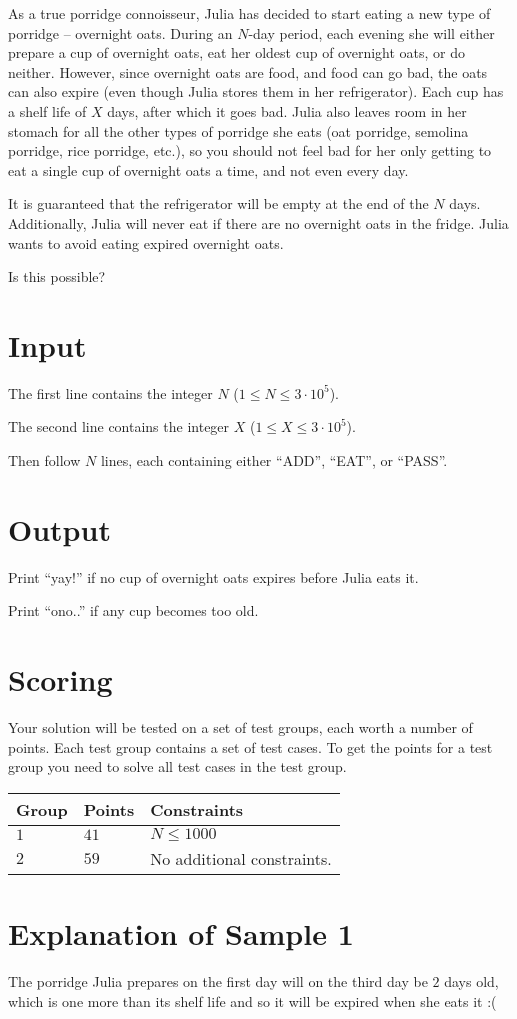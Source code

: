 
As a true porridge connoisseur, Julia has decided to start eating a new type of porridge --
overnight oats. During an $N$-day period, each evening she will either prepare a cup of overnight
oats, eat her oldest cup of overnight oats, or do neither. However, since overnight oats are food,
and food can go bad, the oats can also expire (even though Julia stores them in her refrigerator).
Each cup has a shelf life of $X$ days, after which it goes bad. Julia also leaves room in her
stomach for all the other types of porridge she eats (oat porridge, semolina porridge, rice
porridge, etc.), so you should not feel bad for her only getting to eat a single cup of overnight
oats a time, and not even every day.

It is guaranteed that the refrigerator will be empty at the end of the $N$ days. Additionally, Julia
will never eat if there are no overnight oats in the fridge. Julia wants to avoid eating expired
overnight oats.

Is this possible?

\section*{Input}

The first line contains the integer $N$ ($1 \leq N \leq 3 \cdot 10^5$).

The second line contains the integer $X$ ($1 \leq X \leq 3 \cdot 10^5$).

Then follow $N$ lines, each containing either ``ADD'', ``EAT'', or ``PASS''.

\section*{Output}

Print ``yay!'' if no cup of overnight oats expires before Julia eats it.

Print ``ono..'' if any cup becomes too old.



\section*{Scoring}
Your solution will be tested on a set of test groups, each worth a number of points. Each test group contains
a set of test cases. To get the points for a test group you need to solve all test cases in the test group.

\noindent
\begin{tabular}{| l | l | p{12cm} |}
  \hline
  \textbf{Group} & \textbf{Points} & \textbf{Constraints} \\ \hline
  $1$    & $41$       & $N \leq 1000$ \\ \hline
  $2$    & $59$       & No additional constraints. \\ \hline
\end{tabular}


\section*{Explanation of Sample 1}

The porridge Julia prepares on the first day will on the third day be $2$ days old, which is one
more than its shelf life and so it will be expired when she eats it :(
